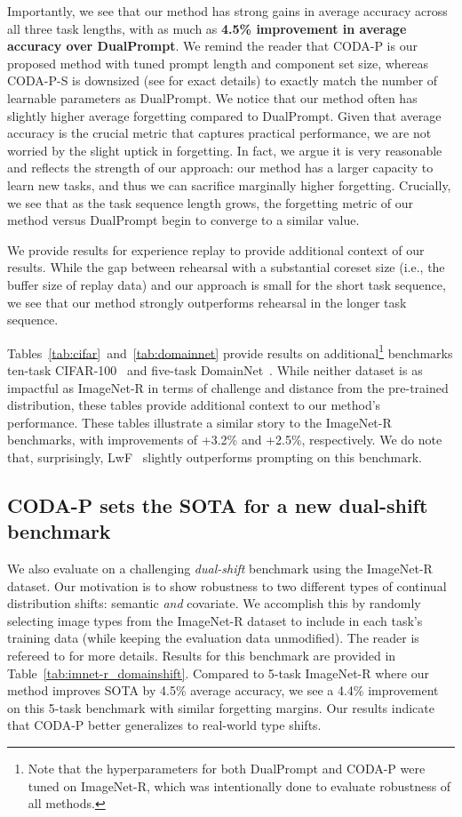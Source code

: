 Importantly, we see that our method has strong gains in average accuracy across all three task lengths, with as much as \textbf{4.5\% improvement in average accuracy over DualPrompt}. We remind the reader that CODA-P is our proposed method with tuned prompt length and component set size, whereas CODA-P-S is downsized (see \SMd{} for exact details) to exactly match the number of learnable parameters as DualPrompt. We notice that our method often has slightly higher average forgetting compared to DualPrompt. Given that average accuracy is the crucial metric that captures practical performance, we are not worried by the slight uptick in forgetting. In fact, we argue it is very reasonable and reflects the strength of our approach: our method has a larger capacity to learn new tasks, and thus we can sacrifice marginally higher forgetting. Crucially, we see that as the task sequence length grows, the forgetting metric of our method versus DualPrompt begin to converge to a similar value. 

We provide results for experience replay to provide additional context of our results. While the gap between rehearsal with a substantial coreset size (i.e., the buffer size of replay data) and our approach is small for the short task sequence, we see that our method strongly outperforms rehearsal in the longer task sequence.

 Tables~\ref{tab:cifar}~and~\ref{tab:domainnet} provide results on additional\footnote{Note that the hyperparameters for both DualPrompt and CODA-P were tuned on ImageNet-R, which was intentionally done to evaluate robustness of all methods.} benchmarks ten-task CIFAR-100~\cite{krizhevsky2009learning} and five-task DomainNet~\cite{peng2019moment}. While neither dataset is as impactful as ImageNet-R in terms of challenge and distance from the pre-trained distribution, these tables provide additional context to our method's performance. 
These tables illustrate a similar story to the ImageNet-R benchmarks, with improvements of +3.2\% and +2.5\%, respectively. We do note that, surprisingly, LwF~\cite{li2016learning} slightly outperforms prompting on this benchmark.

\subsection{CODA-P sets the SOTA for a new dual-shift benchmark}

We also evaluate on a challenging \emph{dual-shift} benchmark using the ImageNet-R dataset. Our motivation is to show robustness to two different types of continual distribution shifts: semantic \emph{and} covariate. We accomplish this by randomly selecting image types from the ImageNet-R dataset to include in each task's training data (while keeping the evaluation data unmodified). The reader is refereed to \SMe{} for more details. Results for this benchmark are provided in Table~\ref{tab:imnet-r_domainshift}. Compared to 5-task ImageNet-R where our method improves SOTA by 4.5\% average accuracy, we see a 4.4\% improvement on this 5-task benchmark with similar forgetting margins. Our results indicate that CODA-P better generalizes to real-world type shifts.%



